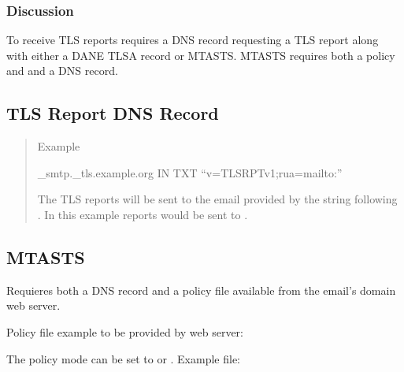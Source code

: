 \documentclass[letterpaper,10pt,english]{sphinxmanual}
\begin{document}
\subsubsection{Discussion}
\label{\detokenize{Readme-TLS:discussion}}
\sphinxAtStartPar
To receive TLS reports requires a DNS record requesting a TLS report along with
either a DANE TLSA record or MTA\sphinxhyphen{}STS. MTA\sphinxhyphen{}STS requires both a policy and
and a DNS record.


\subsection{TLS Report DNS Record}
\label{\detokenize{Readme-TLS:tls-report-dns-record}}\begin{quote}

\sphinxAtStartPar
Example

\sphinxAtStartPar
\_smtp.\_tls.example.org IN TXT “v=TLSRPTv1;rua=mailto:”

\sphinxAtStartPar
The TLS reports will be sent to the email provided by the string following .
In this example reports would be sent to .
\end{quote}


\subsection{MTA\sphinxhyphen{}STS}
\label{\detokenize{Readme-TLS:mta-sts}}
\sphinxAtStartPar
Requieres both a DNS record and a policy file available from the email’s domain web server.

\sphinxAtStartPar
Policy file example to be provided by web server:

\begin{sphinxVerbatim}[commandchars=\\\{\}]
\end{sphinxVerbatim}

\sphinxAtStartPar
The policy mode can be set to  or .
Example  file:

\begin{sphinxVerbatim}[commandchars=\\\{\}]
 
 
 
 \PYGZbs{}
 
\end{sphinxVerbatim}
\end{document}
